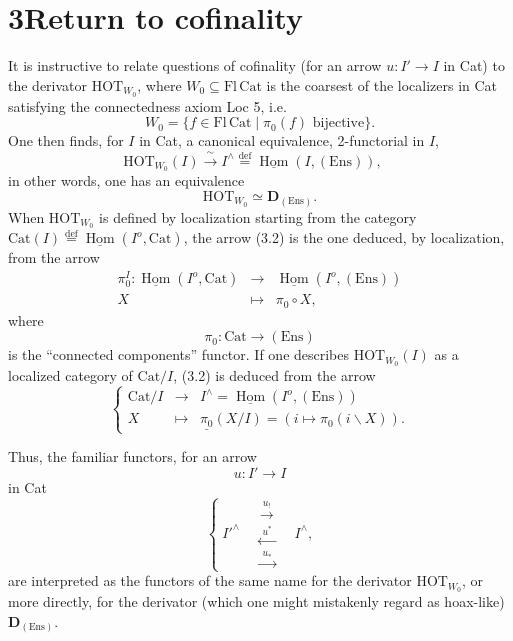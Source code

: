 \documentclass[11pt]{article}
\newcommand{\printedpage}[1]{\marginpar{\footnotesize p.~#1}}
\newcommand{\msp}[1]{\marginpar{\footnotesize [#1]}}
\newcommand{\HOT}{\mathrm{HOT}}
\newcommand{\Cat}{\mathrm{Cat}}
\newcommand{\Fl}{\mathrm{Fl}}
\newcommand{\Ens}{\mathrm{Ens}}
\newcommand{\defeq}{\overset{\text{def}}{=}}
\newcommand{\uHom}{\underline{\operatorname{Hom}}}
\begin{document}
\printedpage{24}
\msp{page 37}

\section*{3\quad Return to cofinality}

It is instructive to relate questions of cofinality (for an arrow $u : I' \longrightarrow I$ in Cat) to the derivator $\HOT_{W_0}$, where $W_0 \subseteq \Fl\,\Cat$ is the coarsest of the localizers in Cat satisfying the connectedness axiom Loc 5, i.e.
\[
W_0 = \{ f \in \Fl\,\Cat \mid \pi_0(f) \text{ bijective}\}. \tag*{(3.1)}
\]
One then finds, for $I$ in Cat, a canonical equivalence, 2-functorial in $I$,
\[
\HOT_{W_0}(I) \xrightarrow{\;\sim\;} I^{\wedge} \defeq \uHom(I,(\Ens)), \quad \tag*{(3.2)}
\]
in other words, one has an equivalence
\[
\HOT_{W_0} \simeq \mathbf{D}_{(\Ens)}. \tag*{(3.3)}
\]
When $\HOT_{W_0}$ is defined by localization starting from the category $\Cat(I) \defeq \uHom(I^o,\Cat)$, the arrow (3.2) is the one deduced, by localization, from the arrow
\[
\begin{array}{rcl}
\pi_0^I : \uHom(I^o,\Cat) & \longrightarrow & \uHom(I^o,(\Ens)) \\[1ex]
X & \longmapsto & \pi_0 \circ X,
\end{array} \tag*{(3.4)}
\]
where
\[
\pi_0 : \Cat \longrightarrow (\Ens) \tag*{(3.5)}
\]
is the ``connected components'' functor. If one describes $\HOT_{W_0}(I)$ as a localized category of $\Cat/I$, (3.2) is deduced from the arrow
\[
\left\{
\begin{array}{rcl}
\Cat/I & \longrightarrow & I^{\wedge} = \uHom(I^o,(\Ens)) \\[1ex]
X & \longmapsto & \underline{\pi_0}(X/I) = (i \longmapsto \pi_0(i\backslash X)).
\end{array}
\right. \tag*{(3.6)}
\]

\msp{page 38}
Thus, the familiar functors, for an arrow
\[
u : I' \longrightarrow I
\]
in Cat
\[
\left\{
\; I'^{\wedge} \quad
\begin{array}{c}
\xrightarrow{\;u_!\;} \\[1.5ex]
\xleftarrow{\;u^*\;} \\[1.5ex]
\xrightarrow{\;u_*\;}
\end{array}
\quad I^{\wedge},
\right. \tag*{(3.7)}
\]
\printedpage{25}
are interpreted as the functors of the same name for the derivator $\HOT_{W_0}$, or more directly, for the derivator (which one might mistakenly regard as hoax-like) $\mathbf{D}_{(\Ens)}$.
\end{document}
